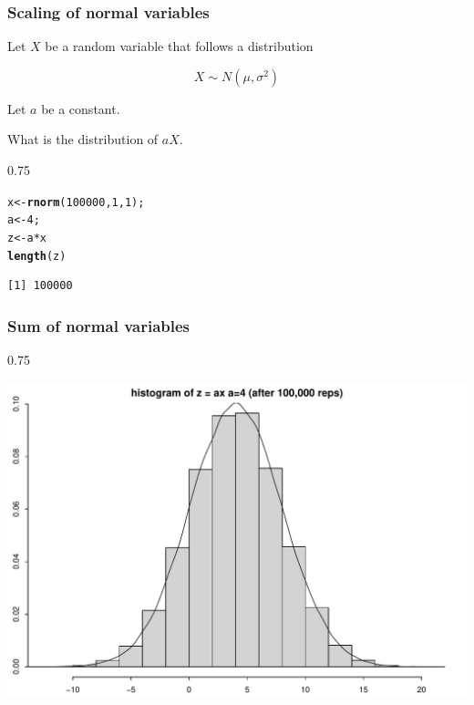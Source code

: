 \documentclass{beamer}\usepackage[]{graphicx}\usepackage[]{color}
\makeatletter
\newcommand{\hlnum}[1]{\textcolor[rgb]{0.2,0.2,0.2}{#1}}%
\newcommand{\hlopt}[1]{\textcolor[rgb]{0.102,0.102,0.102}{#1}}%
\newcommand{\hlstd}[1]{\textcolor[rgb]{0.102,0.102,0.102}{#1}}%
\newcommand{\hlkwb}[1]{\textcolor[rgb]{0.102,0.102,0.102}{#1}}%
\newcommand{\hlkwd}[1]{\textcolor[rgb]{0.102,0.102,0.102}{\textbf{#1}}}%
\newenvironment{kframe}{%
 \def\at@end@of@kframe{}%
 \ifinner\ifhmode%
  \def\at@end@of@kframe{\end{minipage}}%
  \begin{minipage}{\columnwidth}%
 \fi\fi%
 \def\FrameCommand##1{\hskip\@totalleftmargin \hskip-\fboxsep
 \colorbox{shadecolor}{##1}\hskip-\fboxsep
     \hskip-\linewidth \hskip-\@totalleftmargin \hskip\columnwidth}%
 \MakeFramed {\advance\hsize-\width
   \@totalleftmargin\z@ \linewidth\hsize
   \@setminipage}}%
 {\par\unskip\endMakeFramed%
 \at@end@of@kframe}
\newenvironment{knitrout}{}{} %
\renewenvironment{knitrout}{\begin{spacing}{0.75}\begin{tiny}}{\end{tiny}\end{spacing}}
\makeatother
\begin{document}
\begin{frame}[fragile]
\frametitle{Scaling of normal variables}

Let $X$ be a random variable that follows a distribution 

$$ X \sim N(\mu, \sigma^2) $$

Let $a$ be a constant.

What is the distribution of $aX$.

\begin{knitrout}\small
{}\color{fgcolor}\begin{kframe}
\begin{alltt}
\hlstd{x} \hlkwb{<-} \hlkwd{rnorm}\hlstd{(}\hlnum{100000}\hlstd{,} \hlnum{1}\hlstd{,} \hlnum{1}\hlstd{);}
\hlstd{a} \hlkwb{<-} \hlnum{4}\hlstd{;}
\hlstd{z} \hlkwb{<-} \hlstd{a}\hlopt{*}\hlstd{x}
\hlkwd{length}\hlstd{(z)}
\end{alltt}
\begin{verbatim}
[1] 100000
\end{verbatim}
\end{kframe}
\end{knitrout}

\end{frame}

\begin{frame}[fragile]

\frametitle{Sum of normal variables}

\begin{knitrout}\small
{}\color{fgcolor}

{\centering \includegraphics[width=0.99\linewidth]{figure/graphics-unnamed-chunk-14-1} 

}



\end{knitrout}

\end{frame}
\end{document}
